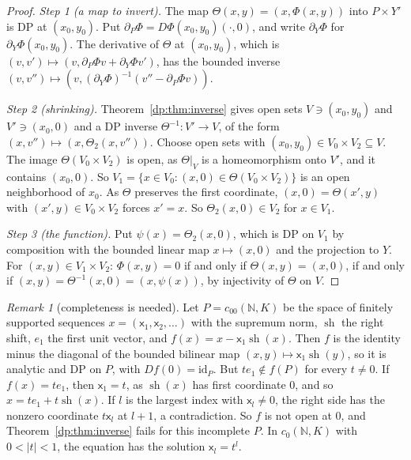 \documentclass[11pt]{amsart}
\theoremstyle{definition}
\theoremstyle{remark}
\newtheorem{remark}[theorem]{Remark}
\numberwithin{equation}{section}
\newcommand{\N}{\mathbb N}
\newcommand{\id}{\mathrm{id}}
\newcommand{\abs}[1]{\lvert #1\rvert}
\theoremstyle{plain}
\theoremstyle{definition}
\theoremstyle{plain}
\newcommand{\sh}{\operatorname{sh}}
\begin{document}
\begin{proof}
\emph{Step 1 (a map to invert).} The map $\Theta(x,y)=(x,\Phi(x,y))$ into $P\times Y'$ is DP at $(x_0,y_0)$. Put $\partial_P\Phi=D\Phi(x_0,y_0)(\cdot,0)$, and write $\partial_Y\Phi$ for $\partial_Y\Phi(x_0,y_0)$. The derivative of $\Theta$ at $(x_0,y_0)$, which is $(v,v')\mapsto(v,\partial_P\Phi v+\partial_Y\Phi v')$, has the bounded inverse $(v,v'')\mapsto(v,(\partial_Y\Phi)^{-1}(v''-\partial_P\Phi v))$.

\emph{Step 2 (shrinking).} Theorem~\ref{dp:thm:inverse} gives open sets $V\ni(x_0,y_0)$ and $V'\ni(x_0,0)$ and a DP inverse $\Theta^{-1}\colon V'\to V$, of the form $(x,v'')\mapsto(x,\Theta_2(x,v''))$. Choose open sets with $(x_0,y_0)\in V_0\times V_2\subseteq V$. The image $\Theta(V_0\times V_2)$ is open, as $\Theta|_V$ is a homeomorphism onto $V'$, and it contains $(x_0,0)$. So $V_1=\{x\in V_0:(x,0)\in\Theta(V_0\times V_2)\}$ is an open neighborhood of $x_0$. As $\Theta$ preserves the first coordinate, $(x,0)=\Theta(x',y)$ with $(x',y)\in V_0\times V_2$ forces $x'=x$. So $\Theta_2(x,0)\in V_2$ for $x\in V_1$.

\emph{Step 3 (the function).} Put $\psi(x)=\Theta_2(x,0)$, which is DP on $V_1$ by composition with the bounded linear map $x\mapsto(x,0)$ and the projection to $Y$. For $(x,y)\in V_1\times V_2$: $\Phi(x,y)=0$ if and only if $\Theta(x,y)=(x,0)$, if and only if $(x,y)=\Theta^{-1}(x,0)=(x,\psi(x))$, by injectivity of $\Theta$ on $V$.
\end{proof}

\begin{remark}[completeness is needed]\label{dp:rem:completeness}
Let $P=c_{00}(\N,K)$ be the space of finitely supported sequences $x=(\mathsf x_1,\mathsf x_2,\dots)$ with the supremum norm, $\sh$ the right shift, $e_1$ the first unit vector, and $f(x)=x-\mathsf x_1\sh(x)$. Then $f$ is the identity minus the diagonal of the bounded bilinear map $(x,y)\mapsto\mathsf x_1\sh(y)$, so it is analytic and DP on $P$, with $Df(0)=\id_P$. But $te_1\notin f(P)$ for every $t\ne0$. If $f(x)=te_1$, then $\mathsf x_1=t$, as $\sh(x)$ has first coordinate $0$, and so $x=te_1+t\sh(x)$. If $l$ is the largest index with $\mathsf x_l\ne0$, the right side has the nonzero coordinate $t\mathsf x_l$ at $l+1$, a contradiction. So $f$ is not open at $0$, and Theorem~\ref{dp:thm:inverse} fails for this incomplete $P$. In $c_0(\N,K)$ with $0<\abs t<1$, the equation has the solution $\mathsf x_l=t^l$.
\end{remark}
\end{document}
